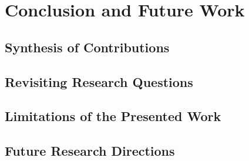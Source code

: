 \chapter{Conclusion and Future Work}
\label{chap:conclusion}

\section{Synthesis of Contributions}
\label{sec:conclusion_synthesis}


\section{Revisiting Research Questions}
\label{sec:conclusion_revisiting_rqs}


\section{Limitations of the Presented Work}
\label{sec:conclusion_limitations}


\section{Future Research Directions}
\label{sec:conclusion_future_work}
